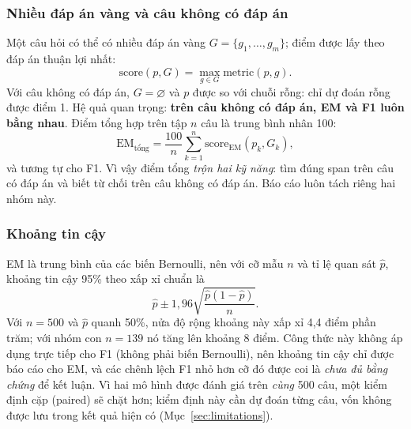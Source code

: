 \subsubsection{Nhiều đáp án vàng và câu không có đáp án}

Một câu hỏi có thể có nhiều đáp án vàng $G = \{g_1, \dots, g_m\}$; điểm được lấy theo đáp
án thuận lợi nhất:
\begin{equation}
  \mathrm{score}(p, G) = \max_{g \in G} \mathrm{metric}(p, g).
\end{equation}
Với câu không có đáp án, $G = \varnothing$ và $p$ được so với chuỗi rỗng: chỉ dự đoán rỗng
được điểm 1. Hệ quả quan trọng: \textbf{trên câu không có đáp án, EM và F1 luôn bằng
nhau}. Điểm tổng hợp trên tập $n$ câu là trung bình nhân 100:
\begin{equation}
  \mathrm{EM}_{\text{tổng}} = \frac{100}{n} \sum_{k=1}^{n} \mathrm{score}_{\mathrm{EM}}(p_k, G_k),
\end{equation}
và tương tự cho F1. Vì vậy điểm tổng \emph{trộn hai kỹ năng}: tìm đúng span trên câu có
đáp án và biết từ chối trên câu không có đáp án. Báo cáo luôn tách riêng hai nhóm này.

\subsubsection{Khoảng tin cậy}
\label{sec:ci}

EM là trung bình của các biến Bernoulli, nên với cỡ mẫu $n$ và tỉ lệ quan sát $\hat{p}$,
khoảng tin cậy 95\% theo xấp xỉ chuẩn là
\begin{equation}
  \hat{p} \pm 1{,}96 \sqrt{\frac{\hat{p}(1 - \hat{p})}{n}} .
  \label{eq:ci}
\end{equation}
Với $n = 500$ và $\hat{p}$ quanh 50\%, nửa độ rộng khoảng này xấp xỉ 4,4 điểm phần trăm;
với nhóm con $n = 139$ nó tăng lên khoảng 8 điểm. Công thức này không áp dụng trực tiếp
cho F1 (không phải biến Bernoulli), nên khoảng tin cậy chỉ được báo cáo cho EM, và các
chênh lệch F1 nhỏ hơn cỡ đó được coi là \emph{chưa đủ bằng chứng} để kết luận. Vì hai mô
hình được đánh giá trên \emph{cùng} 500 câu, một kiểm định cặp (paired) sẽ chặt hơn;
kiểm định này cần dự đoán từng câu, vốn không được lưu trong kết quả hiện có
(Mục~\ref{sec:limitations}).

